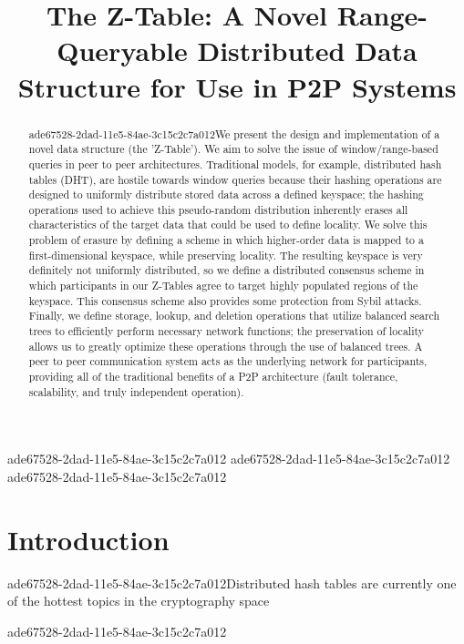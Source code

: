 \documentclass[12pt]{article}
\title{The Z-Table: A Novel Range-Queryable Distributed Data Structure for Use in P2P Systems}
\begin{document}
\maketitle

\begin{abstract}
ade67528-2dad-11e5-84ae-3c15c2c7a012We present the design and implementation of a novel data structure (the 'Z-Table'). We aim to solve the issue of window/range-based queries in peer to peer architectures. Traditional models, for example,  distributed hash tables (DHT), are hostile towards window queries because their hashing operations are designed to uniformly distribute stored data across a defined keyspace; the hashing operations used to achieve this pseudo-random distribution inherently erases all characteristics of the target data that could be used to define locality. We solve this problem of erasure by defining a scheme in which higher-order data is mapped to a first-dimensional keyspace, while preserving locality. The resulting keyspace is very definitely not uniformly distributed, so we define a distributed consensus scheme in which participants in our Z-Tables agree to target highly populated regions of the keyspace. This consensus scheme also provides some protection from Sybil attacks. Finally, we define storage, lookup, and deletion operations that utilize balanced search trees to efficiently perform necessary network functions; the preservation of locality allows us to greatly optimize these operations through the use of balanced trees. A peer to peer communication system acts as the underlying network for participants, providing all of the traditional benefits of a P2P architecture (fault tolerance, scalability, and truly independent operation).
\end{abstract}
ade67528-2dad-11e5-84ae-3c15c2c7a012
ade67528-2dad-11e5-84ae-3c15c2c7a012
\newpage
ade67528-2dad-11e5-84ae-3c15c2c7a012\section{Introduction}
ade67528-2dad-11e5-84ae-3c15c2c7a012Distributed hash tables are currently one of the hottest topics in the cryptography space~\cite{Stoica:2001dj,Rowstron:2001ea,Ratnasamy:2001wn}

\printbibliography
ade67528-2dad-11e5-84ae-3c15c2c7a012
\end{document}
